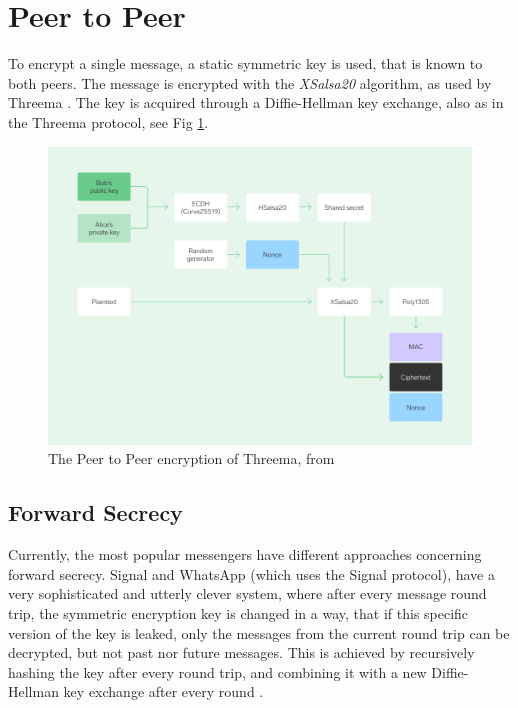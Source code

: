 \documentclass[a4paper, oneside]{discothesis}
\begin{document}
\section{Peer to Peer}
To encrypt a single message, a static symmetric key is used, that is known to both peers. The message is encrypted with the \emph{XSalsa20} algorithm, as used by Threema \cite{Threema}. The key is acquired through a Diffie-Hellman key exchange, also as in the Threema protocol, see Fig \ref{fig:peer_encryption}.

\begin{figure}[h!]
    \centering
    \includegraphics[width=\columnwidth]{figures/threema.png}
    \caption{The Peer to Peer encryption of Threema, from \cite{Threema}}
    \label{fig:peer_encryption}
\end{figure}

\subsection{Forward Secrecy}
\label{sec:forward_secrecy}

Currently, the most popular messengers have different approaches concerning forward secrecy. Signal and WhatsApp (which uses the Signal protocol), have a very sophisticated and utterly clever system, where after every message round trip, the symmetric encryption key is changed in a way, that if this specific version of the key is leaked, only the messages from the current round trip can be decrypted, but not past nor future messages. This is achieved by recursively hashing the key after every round trip, and combining it with a new Diffie-Hellman key exchange after every round \cite{DoubleRatchet}.
\end{document}
